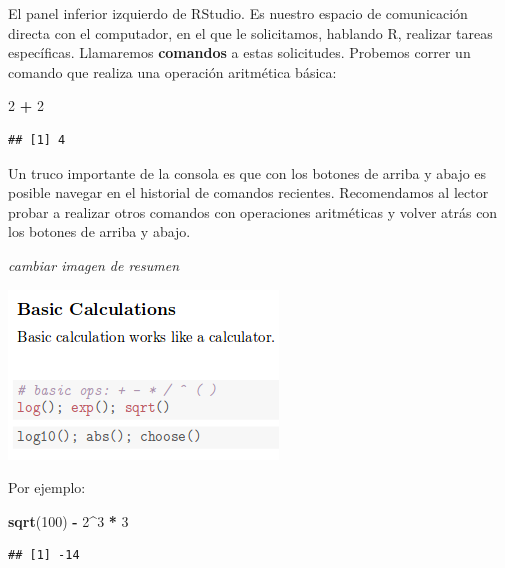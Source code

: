 \documentclass[]{book}
\newenvironment{Shaded}{\begin{snugshade}}{\end{snugshade}}
\newcommand{\KeywordTok}[1]{\textcolor[rgb]{0.13,0.29,0.53}{\textbf{#1}}}
\newcommand{\DecValTok}[1]{\textcolor[rgb]{0.00,0.00,0.81}{#1}}
\newcommand{\StringTok}[1]{\textcolor[rgb]{0.31,0.60,0.02}{#1}}
\newcommand{\OperatorTok}[1]{\textcolor[rgb]{0.81,0.36,0.00}{\textbf{#1}}}
\newcommand{\NormalTok}[1]{#1}
\begin{document}
El panel inferior izquierdo de RStudio. Es nuestro espacio de
comunicación directa con el computador, en el que le solicitamos,
hablando R, realizar tareas específicas. Llamaremos \textbf{comandos} a
estas solicitudes. Probemos correr un comando que realiza una operación
aritmética básica:

\begin{Shaded}
\begin{Highlighting}[]
\DecValTok{2} \OperatorTok{+}\StringTok{ }\DecValTok{2}
\end{Highlighting}
\end{Shaded}

\begin{verbatim}
## [1] 4
\end{verbatim}

Un truco importante de la consola es que con los botones de arriba y
abajo es posible navegar en el historial de comandos recientes.
Recomendamos al lector probar a realizar otros comandos con operaciones
aritméticas y volver atrás con los botones de arriba y abajo.

\emph{cambiar imagen de resumen}

\includegraphics[width=0.8\linewidth]{00-images/fig_3_2}

Por ejemplo:

\begin{Shaded}
\begin{Highlighting}[]
\KeywordTok{sqrt}\NormalTok{(}\DecValTok{100}\NormalTok{) }\OperatorTok{-}\StringTok{ }\DecValTok{2}\OperatorTok{^}\DecValTok{3} \OperatorTok{*}\StringTok{ }\DecValTok{3}
\end{Highlighting}
\end{Shaded}

\begin{verbatim}
## [1] -14
\end{verbatim}
\end{document}

